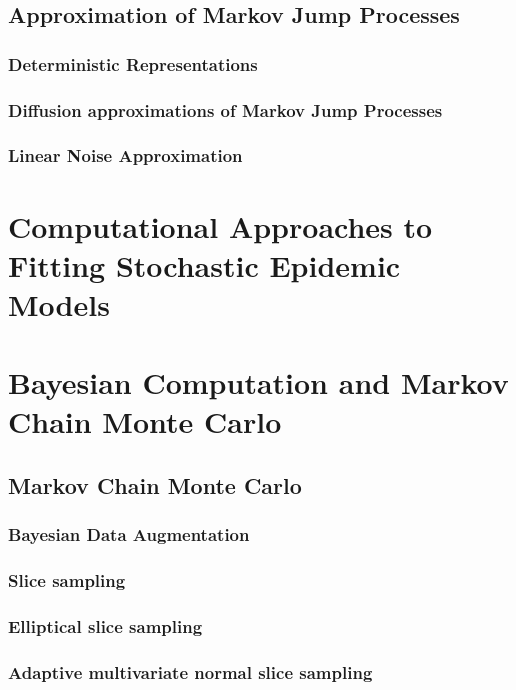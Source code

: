 \subsection{Approximation of Markov Jump Processes}
\label{subsec:sem_approximations}

\subsubsection{Deterministic Representations}
\label{subsec:deterministic_models}

\subsubsection{Diffusion approximations of Markov Jump Processes}
\label{subsubsec:diff_approx}

\subsubsection{Linear Noise Approximation}
\label{subsubsec:lna_background}

\section{Computational Approaches to Fitting Stochastic Epidemic Models}
\label{sec:computational_background}

\section{Bayesian Computation and Markov Chain Monte Carlo}
\label{sec:bayesian_computation}

\subsection{Markov Chain Monte Carlo}
\label{subsec:mcmc}

\subsubsection{Bayesian Data Augmentation}
\label{subsec:data_augmentation}

\subsubsection{Slice sampling}
\label{subsubsec:slice_sampling}

\subsubsection{Elliptical slice sampling}
\label{subsubsec:elliptical_slice_sampling}

\subsubsection{Adaptive multivariate normal slice sampling}
\label{subsubsec:mvn_slice_sampling}